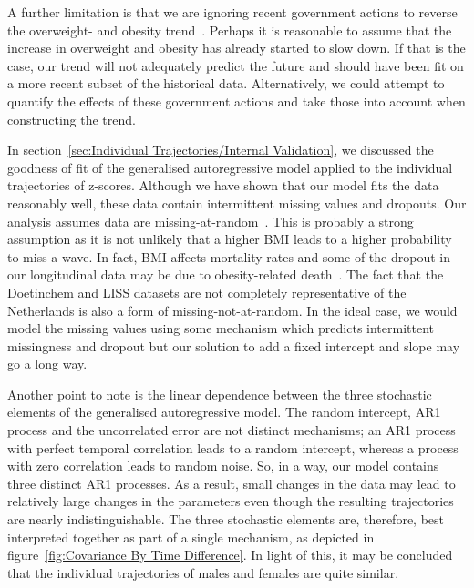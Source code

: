 \documentclass{imammb}
\numberwithin{equation}{section}
\begin{document}
A further limitation is that we are ignoring recent government actions to reverse the overweight- and obesity trend~\citep{VWS2018, VanRinsum2018}. Perhaps it is reasonable to assume that the increase in overweight and obesity has already started to slow down. If that is the case, our trend will not adequately predict the future and should have been fit on a more recent subset of the historical data. Alternatively, we could attempt to quantify the effects of these government actions and take those into account when constructing the trend.

In section~\ref{sec:Individual Trajectories/Internal Validation}, we discussed the goodness of fit of the generalised autoregressive model applied to the \mbox{individual} trajectories of z-scores. Although we have shown that our model fits the data reasonably well, these data contain intermittent missing values and dropouts. Our analysis assumes data are missing-at-random~\citep{Diggle1994, Verbeke2000}. This is probably a strong assumption as it is not unlikely that a higher BMI leads to a higher probability to miss a wave. In fact, BMI \mbox{affects} mortality rates and some of the dropout in our longitudinal data may be due to obesity-related death~\citep{Hoogenveen2000}. The fact that the Doetinchem and LISS datasets are not completely representative of the Netherlands is also a form of missing-not-at-random. In the ideal case, we would model the missing values using some mechanism which predicts intermittent missingness and dropout but our solution to add a fixed intercept and slope may go a long way.

Another point to note is the linear dependence between the three stochastic elements of the generalised autoregressive model. The random intercept, AR1 process and the uncorrelated error are not distinct mechanisms; an AR1 process with perfect temporal correlation leads to a random intercept, whereas a process with zero correlation leads to random noise. So, in a way, our model contains three distinct AR1 processes. As a result, small changes in the data may lead to relatively large changes in the parameters even though the resulting trajectories are nearly indistinguishable. The three stochastic elements are, therefore, best interpreted together as part of a single mechanism, as depicted in figure~\ref{fig:Covariance By Time Difference}. In light of this, it may be concluded that the individual trajectories of males and females are quite similar.
\end{document}
